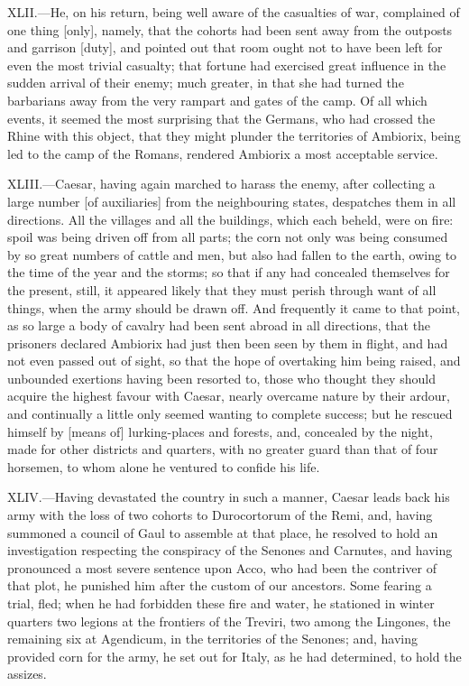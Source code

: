 XLII.—He, on his return, being well aware of the casualties of war,
complained of one thing [only], namely, that the cohorts had been sent
away from the outposts and garrison [duty], and pointed out that room
ought not to have been left for even the most trivial casualty; that
fortune had exercised great influence in the sudden arrival of their
enemy; much greater, in that she had turned the barbarians away from the
very rampart and gates of the camp. Of all which events, it seemed the
most surprising that the Germans, who had crossed the Rhine with this
object, that they might plunder the territories of Ambiorix, being led
to the camp of the Romans, rendered Ambiorix a most acceptable service.

XLIII.—Caesar, having again marched to harass the enemy, after
collecting a large number [of auxiliaries] from the neighbouring states,
despatches them in all directions. All the villages and all the
buildings, which each beheld, were on fire: spoil was being driven off
from all parts; the corn not only was being consumed by so great numbers
of cattle and men, but also had fallen to the earth, owing to the time
of the year and the storms; so that if any had concealed themselves for
the present, still, it appeared likely that they must perish through
want of all things, when the army should be drawn off. And frequently it
came to that point, as so large a body of cavalry had been sent abroad
in all directions, that the prisoners declared Ambiorix had just then
been seen by them in flight, and had not even passed out of sight, so
that the hope of overtaking him being raised, and unbounded exertions
having been resorted to, those who thought they should acquire the
highest favour with Caesar, nearly overcame nature by their ardour, and
continually a little only seemed wanting to complete success; but he
rescued himself by [means of] lurking-places and forests, and, concealed
by the night, made for other districts and quarters, with no greater
guard than that of four horsemen, to whom alone he ventured to confide
his life.

XLIV.—Having devastated the country in such a manner, Caesar leads back
his army with the loss of two cohorts to Durocortorum of the Remi, and,
having summoned a council of Gaul to assemble at that place, he resolved
to hold an investigation respecting the conspiracy of the Senones and
Carnutes, and having pronounced a most severe sentence upon Acco, who
had been the contriver of that plot, he punished him after the custom of
our ancestors. Some fearing a trial, fled; when he had forbidden these
fire and water, he stationed in winter quarters two legions at the
frontiers of the Treviri, two among the Lingones, the remaining six at
Agendicum, in the territories of the Senones; and, having provided corn
for the army, he set out for Italy, as he had determined, to hold the
assizes.

